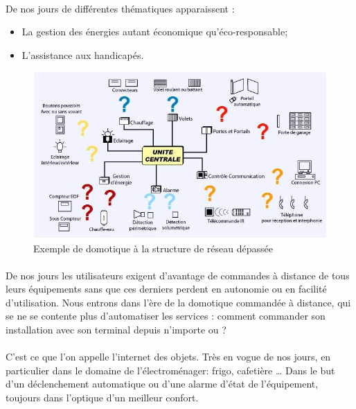         \paragraph{}
De nos jours de différentes thématiques apparaissent :
            \begin{itemize}
                \item La gestion des énergies autant économique qu'éco-responsable;
                \item L'assistance aux handicapés.
            \end{itemize}
        \begin{figure}
            \begin{center}
                \includegraphics[scale=0.5]{./images/cpl/imageUniteCentrale.jpg}
            \end{center}
                \caption{ Exemple de domotique à la structure de réseau dépassée } %
                \label{Exemple de domotique avec commande centrale}
        \end{figure}
        \paragraph{}
De nos jours les utilisateurs exigent d'avantage de commandes à distance de tous leurs équipements sans que ces derniers perdent en autonomie ou en facilité d'utilisation.
Nous entrons dans l’ère de la domotique commandée à distance, qui se ne se contente plus d'automatiser les services :
comment commander son installation avec son terminal depuis n'importe ou ?
        \paragraph{}
C’est ce que l’on appelle l’internet des objets.
Très en vogue de nos jours, en particulier dans le domaine de l’électroménager: frigo, cafetière …
Dans le but d'un déclenchement automatique ou d'une alarme d'état de l'équipement, toujours dans l’optique d’un meilleur confort.
